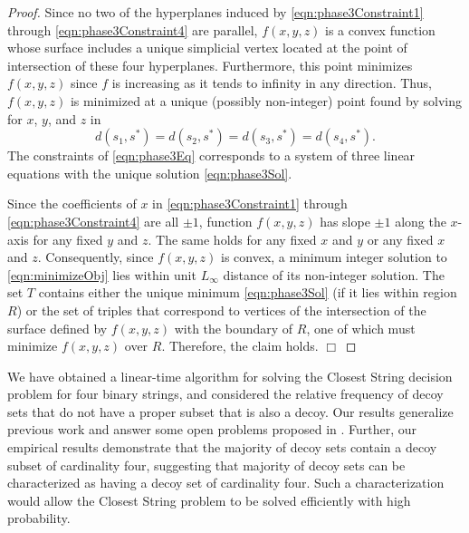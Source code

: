 \begin{proof}
Since no two of the hyperplanes 
induced by \eqref{eqn:phase3Constraint1} through \eqref{eqn:phase3Constraint4}
are parallel,
$f(x,y,z)$ is a convex function whose surface includes 
a unique simplicial vertex 
located at the point of intersection of these four hyperplanes.
Furthermore, this point minimizes $f(x,y,z)$ 
since $f$ is increasing as it tends to infinity in any direction.
Thus, $f(x,y,z)$ is minimized at a unique (possibly non-integer) point
found by solving for $x$, $y$, and $z$ in
\begin{equation}
\label{eqn:phase3Eq}
d(s_1, s^*) = d(s_2, s^*) = d(s_3, s^*) = d(s_4, s^*) . 
\end{equation}
The constraints of \eqref{eqn:phase3Eq} corresponds to a system of three linear
equations with the unique solution \eqref{eqn:phase3Sol}.

Since the coefficients of $x$
in \eqref{eqn:phase3Constraint1} through \eqref{eqn:phase3Constraint4}
are all $\pm 1$, function $f(x,y,z)$ has slope $\pm 1$ along the $x$-axis
for any fixed $y$ and $z$.
The same holds for any fixed $x$ and $y$ or any fixed $x$ and $z$.
Consequently, since $f(x,y,z)$ is convex, a minimum integer solution to 
\eqref{eqn:minimizeObj} lies within unit $L_\infty$ distance 
of its non-integer solution.
The set $T$ contains either the unique minimum \eqref{eqn:phase3Sol}
(if it lies within region $R$) 
or the set of triples that correspond to vertices of the
intersection of the surface defined by 
$f(x,y,z)$ with the boundary of $R$, 
one of which must minimize $f(x,y,z)$ over $R$.
Therefore, the claim holds. \hfill $\Box$ \end{proof}

We have obtained a linear-time algorithm for solving the {\sc Closest String} decision problem for four binary strings, and considered the relative frequency of decoy sets that do not have a proper subset that is also a decoy.  Our results generalize previous work and answer some open problems proposed in \cite{GNR01}.  Further, our empirical results demonstrate that the majority of decoy sets contain a decoy subset of cardinality four, suggesting that majority of decoy sets can be characterized as having a decoy set of cardinality four.  Such a characterization would allow the {\sc Closest String} problem to be solved efficiently with high probability.


